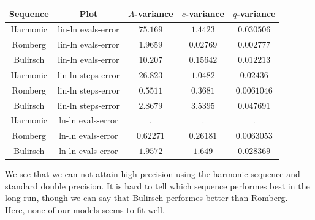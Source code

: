 \begin{table}[H]
    \centering
    \begin{tabular}{c|c||c|c|c}
Sequence & Plot & \(A\)-variance & \(c\)-variance & \(q\)-variance\\\hline
Harmonic & lin-ln evals-error & \(75.169\) & \(1.4423\) & \(0.030506\) \\
Romberg & lin-ln evals-error & \(1.9659\) & \(0.02769\) & \(0.002777\) \\
Bulirsch & lin-ln evals-error & \(10.207\) & \(0.15642\) & \(0.012213\) \\
Harmonic & lin-ln steps-error & \(26.823\) & \(1.0482\) & \(0.02436\) \\
Romberg & lin-ln steps-error & \(0.5511\) & \(0.3681\) & \(0.0061046\) \\
Bulirsch & lin-ln steps-error & \(2.8679\) & \(3.5395\) & \(0.047691\) \\
Harmonic & ln-ln evals-error & . & . & . \\
Romberg & ln-ln evals-error & \(0.62271\) & \(0.26181\) & \(0.0063053\) \\
Bulirsch & ln-ln evals-error & \(1.9572\) & \(1.649\) & \(0.028369\) \\
    \end{tabular}
    \label{tab:my_label}
\end{table}

We see that we can not attain high precision using the harmonic sequence and standard double precision. It is hard to tell which sequence performes best in the long run, though we can say that Bulirsch performes better than Romberg.\\

Here, none of our models seems to fit well. 


